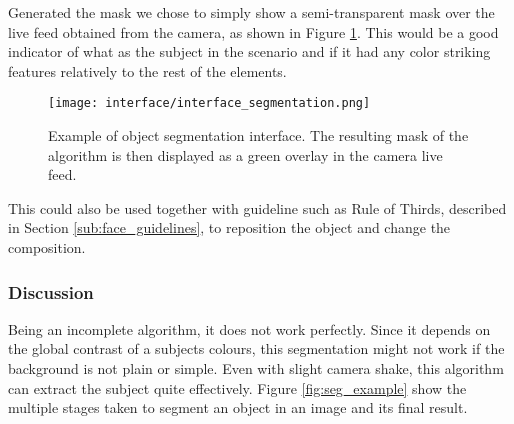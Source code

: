 Generated the mask we chose to simply show a semi-transparent mask over the live feed obtained from the camera, as shown in Figure \ref{fig:interface_segmentation}. This would be a good indicator of what as the subject in the scenario and if it had any color striking features relatively to the rest of the elements.

\begin{figure}[htbp]
	\centering
	\texttt{[image: interface/interface\_segmentation.png]}
    \caption{Example of object segmentation interface. The resulting mask of the algorithm is then displayed as a green overlay in the camera live feed.}
  	\label{fig:interface_segmentation}
\end{figure}

This could also be used together with guideline such as Rule of Thirds, described in Section \ref{sub:face_guidelines}, to reposition the object and change the composition.

\subsubsection{Discussion}
\label{subsub:seg_discussion}
Being an incomplete algorithm, it does not work perfectly. Since it depends on the global contrast of a subjects colours, this segmentation might not work if the background is not plain or simple. Even with slight camera shake, this algorithm can extract the subject quite effectively. Figure \ref{fig:seg_example} show the multiple stages taken to segment an object in an image and its final result.

